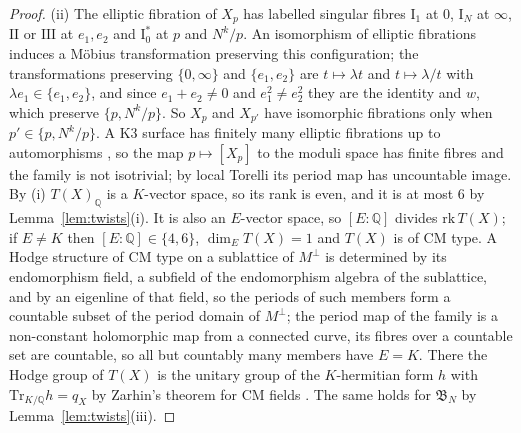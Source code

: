 \documentclass[11pt,reqno]{amsart}
\numberwithin{equation}{section}
\theoremstyle{plain}
\theoremstyle{definition}
\newcommand{\QQ}{\mathbb{Q}}
\newcommand{\Tr}{\mathrm{Tr}}
\begin{document}
\begin{proof}
(ii) The elliptic fibration of $X_{p}$ has labelled singular fibres $\mathrm{I}_{1}$ at $0$, $\mathrm{I}_{N}$ at $\infty$, $\mathrm{II}$ or $\mathrm{III}$ at $e_{1},e_{2}$ and $\mathrm{I}_{0}^{*}$ at $p$ and $N^{k}/p$. An isomorphism of elliptic fibrations induces a M\"obius transformation preserving this configuration; the transformations preserving $\{0,\infty\}$ and $\{e_{1},e_{2}\}$ are $t\mapsto\lambda t$ and $t\mapsto\lambda/t$ with $\lambda e_{1}\in\{e_{1},e_{2}\}$, and since $e_{1}+e_{2}\ne0$ and $e_{1}^{2}\ne e_{2}^{2}$ they are the identity and $w$, which preserve $\{p,N^{k}/p\}$. So $X_{p}$ and $X_{p'}$ have isomorphic fibrations only when $p'\in\{p,N^{k}/p\}$. A K3 surface has finitely many elliptic fibrations up to automorphisms \cite{Ste85}, so the map $p\mapsto[X_{p}]$ to the moduli space has finite fibres and the family is not isotrivial; by local Torelli its period map has uncountable image. By (i) $T(X)_{\QQ}$ is a $K$-vector space, so its rank is even, and it is at most $6$ by Lemma~\ref{lem:twists}(i). It is also an $E$-vector space, so $[E:\QQ]$ divides $\mathrm{rk}\,T(X)$; if $E\ne K$ then $[E:\QQ]\in\{4,6\}$, $\dim_{E}T(X)=1$ and $T(X)$ is of CM type. A Hodge structure of CM type on a sublattice of $M^{\perp}$ is determined by its endomorphism field, a subfield of the endomorphism algebra of the sublattice, and by an eigenline of that field, so the periods of such members form a countable subset of the period domain of $M^{\perp}$; the period map of the family is a non-constant holomorphic map from a connected curve, its fibres over a countable set are countable, so all but countably many members have $E=K$. There the Hodge group of $T(X)$ is the unitary group of the $K$-hermitian form $h$ with $\Tr_{K/\QQ}h=q_{X}$ by Zarhin's theorem for CM fields \cite[Thm.~2.3.1]{Zar83}. The same holds for $\mathfrak{B}_{N}$ by Lemma~\ref{lem:twists}(iii).


\end{proof}
\end{document}
